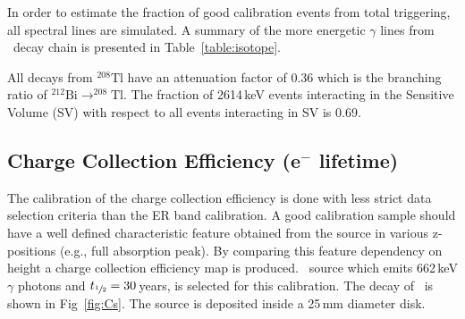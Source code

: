 In order to estimate the fraction of good calibration events from total triggering, all spectral lines are simulated.  
A summary of the more energetic $\gamma$ lines from \Th\ decay chain is presented in Table~\ref{table:isotope}.
\begin{table}
\begin{center}
\caption{High energy $\gamma$lines from \Th\ decay chain}
\label{table:isotope}
\end{center}
\end{table}

All decays from $^{208}\mathrm{Tl}$ have an attenuation factor of 0.36 which is the branching ratio of $^{212}\mathrm{Bi} \rightarrow ^{208}\mathrm{Tl}$.
The fraction of 2614\,keV events interacting in the Sensitive Volume (SV) with respect to all events interacting in SV is 0.69.

\subsection{Charge Collection Efficiency (e$^-$ lifetime)}
The calibration of the charge collection efficiency is done with less strict data selection criteria than the ER band calibration. A good calibration sample  should have a well defined characteristic feature obtained from the source in various z-positions (e.g., full absorption peak). By comparing this feature dependency on height a charge collection efficiency map is produced. \Cs\ source which emits 662\,keV $\gamma$ photons and $t_{\sfrac{1}{2}} = 30$\,years, is selected for this calibration. The decay of \Cs\ is shown in Fig~\ref{fig:Cs}. The source is deposited inside a 25\,mm diameter disk. 


